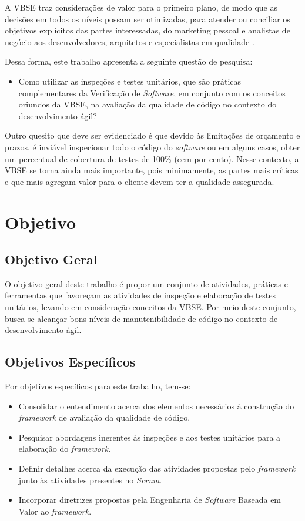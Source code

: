 A VBSE traz considerações de valor para o primeiro plano, de modo que as decisões em todos os níveis possam ser otimizadas, para atender ou conciliar os objetivos explícitos das partes interessadas, do marketing pessoal e analistas de negócio aos desenvolvedores, arquitetos e especialistas em qualidade \cite{vbse1}.

Dessa forma, este trabalho apresenta a seguinte questão de pesquisa:

\begin{itemize}
	\item Como utilizar as inspeções e testes unitários, que são práticas complementares da Verificação de \textit{Software}, em conjunto com os conceitos oriundos da VBSE, na avaliação da qualidade de código no contexto do desenvolvimento ágil?
\end{itemize}

Outro quesito que deve ser evidenciado é que devido às limitações de orçamento e prazos, é inviável inspecionar todo o código do \textit{software} ou em alguns casos, obter um percentual de cobertura de testes de 100\% (cem por cento). Nesse contexto, a VBSE se torna ainda mais importante, pois minimamente, as partes mais críticas e que mais agregam valor para o cliente devem ter a qualidade assegurada.

\section{Objetivo}

\subsection{Objetivo Geral}

O objetivo geral deste trabalho é propor um conjunto de atividades, práticas e ferramentas que favoreçam as atividades de inspeção e elaboração de testes unitários, levando em consideração conceitos da VBSE. Por meio deste conjunto, busca-se alcançar bons níveis de manutenibilidade de código no contexto de desenvolvimento ágil.

\subsection{Objetivos Específicos}

Por objetivos específicos para este trabalho, tem-se:

\begin{itemize}
	\item Consolidar o entendimento acerca dos elementos necessários à construção do \textit{framework} de avaliação da qualidade de código.
	\item Pesquisar abordagens inerentes às inspeções e aos testes unitários para a elaboração do \textit{framework}.
	\item Definir detalhes acerca da execução das atividades propostas pelo \textit{framework} junto às atividades presentes no \textit{Scrum}.
	\item Incorporar diretrizes propostas pela Engenharia de \textit{Software} Baseada em Valor ao \textit{framework}.
\end{itemize}

